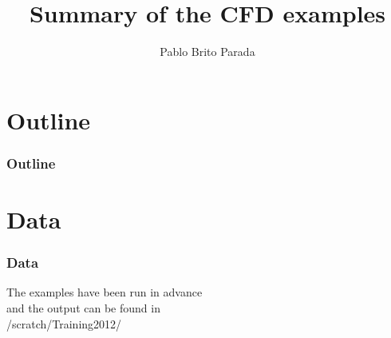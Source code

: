 \documentclass[10pt]{beamer}
\title[CFD examples]{Summary of the CFD examples}
\subtitle[]{}
\institute{Department of Earth Science and Engineering, Imperial College London}
\author[Pablo Brito Parada]{\large{Pablo Brito Parada}}
\date{}
\begin{document}
\begin{frame}
  \titlepage
\end{frame}

\section*{Outline}
\begin{frame}
  \frametitle{Outline}
  \tableofcontents
\end{frame}








\section*{Data}
\begin{frame}
  \frametitle{Data}
  \begin{center}
  The examples have been run in advance \\ and the output can be found in \\
  \vspace{1cm}
  /scratch/Training2012/
  \end{center}
\end{frame}
\end{document}
